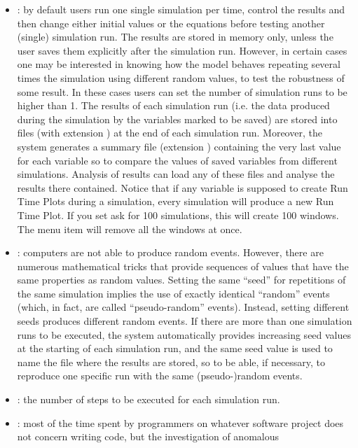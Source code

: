 \documentclass [11pt,a4paper] {book}
\begin{document}
\begin{itemize}
  \item {}: by default users run one single simulation per
  time, control the results and then change either initial values or the equations before
  testing another (single) simulation run. The results are stored in memory only, unless the user saves them explicitly after the simulation run.
  However, in certain cases one may be interested in
  knowing how the model behaves repeating several times the simulation using different
  random values, to test the robustness of some result. In these cases users can set
  the number of simulation runs to be higher than 1. The results of each simulation run
  (i.e. the data produced during the simulation by the variables marked to be saved) are
  stored into files (with extension ) at the end of each simulation run. Moreover, the system generates
  a summary file (extension )
  containing the very last value for each variable so to compare the values
  of saved variables from different simulations. Analysis of results can load any of
  these files and analyse the results there contained.
  Notice that if any variable is supposed to create Run Time Plots during a simulation, every simulation will produce a
  new Run Time Plot. If you set ask for 100 simulations, this will create 100 windows.
  The menu item  will remove all the windows at once.
  \item {}: computers are not able to produce random events.
  However, there are numerous mathematical tricks that provide sequences of values that
  have the same properties as random values. Setting the same ``seed'' for repetitions of the same simulation
  implies the use of exactly identical ``random'' events (which, in fact, are 
  called ``pseudo-random'' events). Instead, setting different seeds produces different
  random events. If there are more than one simulation runs to be executed, the system
  automatically provides increasing seed values at the starting of each simulation
  run, and the same seed value is used to name the file where the results are stored, so
  to be able, if necessary, to reproduce one specific run with the same (pseudo-)random
  events.
  \item {}: the number of steps to be executed for each simulation
  run. 
  \item {}: most of the time spent by programmers on whatever
  software project does not concern writing code, but the investigation of anomalous

\end{itemize}
\end{document}
